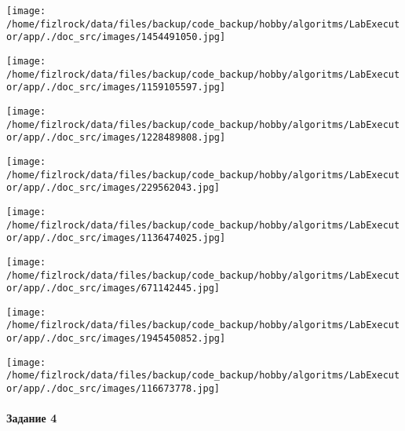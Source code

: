 \documentclass[a4paper, 12pt]{article}
\begin{document}
\texttt{[image: /home/fizlrock/data/files/backup/code\_backup/hobby/algoritms/LabExecutor/app/./doc\_src/images/1454491050.jpg]}

\texttt{[image: /home/fizlrock/data/files/backup/code\_backup/hobby/algoritms/LabExecutor/app/./doc\_src/images/1159105597.jpg]}

\texttt{[image: /home/fizlrock/data/files/backup/code\_backup/hobby/algoritms/LabExecutor/app/./doc\_src/images/1228489808.jpg]}

\texttt{[image: /home/fizlrock/data/files/backup/code\_backup/hobby/algoritms/LabExecutor/app/./doc\_src/images/229562043.jpg]}

\texttt{[image: /home/fizlrock/data/files/backup/code\_backup/hobby/algoritms/LabExecutor/app/./doc\_src/images/1136474025.jpg]}

\texttt{[image: /home/fizlrock/data/files/backup/code\_backup/hobby/algoritms/LabExecutor/app/./doc\_src/images/671142445.jpg]}

\texttt{[image: /home/fizlrock/data/files/backup/code\_backup/hobby/algoritms/LabExecutor/app/./doc\_src/images/1945450852.jpg]}

\texttt{[image: /home/fizlrock/data/files/backup/code\_backup/hobby/algoritms/LabExecutor/app/./doc\_src/images/116673778.jpg]}
\pagebreak
\paragraph{Задание 4}
\end{document}
